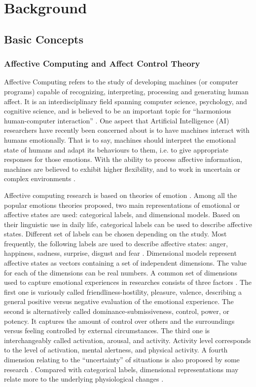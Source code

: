 \chapter{Background}
\label{chap:bg}

\section{Basic Concepts}
\label{sec:concepts}
\subsection{Affective Computing and Affect Control Theory}

Affective Computing refers to the study of developing machines (or computer programs) capable of recognizing, interpreting, processing and generating human affect. It is an interdisciplinary field spanning computer science, psychology, and cognitive science, and is believed to be an important topic for ``harmonious human-computer interaction'' \cite{tao2005affective}. One aspect that Artificial Intelligence (AI) researchers have recently been concerned about is to have machines interact with humans emotionally. That is to say, machines should interpret the emotional state of humans and adapt its behaviours to them, i.e. to give appropriate responses for those emotions. With the ability to process affective information, machines are believed to exhibit higher flexibility, and to work in uncertain or complex environments \cite{picard2000affective}.

Affective computing research is based on theories of emotion \cite{lewis2010handbook}. Among all the popular emotions theories proposed, two main representations of emotional or affective states are used: categorical labels, and dimensional models. Based on their linguistic use in daily life, categorical labels can be used to describe affective states. Different set of labels can be chosen depending on the study. Most frequently, the following labels are used to describe affective states: anger, happiness, sadness, surprise, disgust and fear \cite{ekman1992there}. Dimensional models represent affective states as vectors containing a set of independent dimensions. The value for each of the dimensions can be real numbers. A common set of dimensions used to capture emotional experiences in researches consists of three factors \cite{scholl2013socio}. The first one is variously called friendliness-hostility, pleasure, valence, describing a general positive versus negative evaluation of the emotional experience. The second is alternatively called dominance-submissiveness, control, power, or potency. It captures the amount of control over others and the surroundings versus feeling controlled by external circumstances. The third one is interchangeably called activation, arousal, and activity. Activity level corresponds to the level of activation, mental alertness, and physical activity. A fourth dimension relating to the ``uncertainty'' of situations is also proposed by some research \cite{fontaine2007world}.  Compared with categorical labels, dimensional representations may relate more to the underlying physiological changes \cite{mauss2009measures}.

